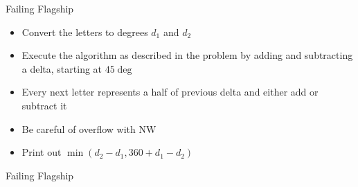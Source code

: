 \documentclass[11pt,pdf, aspectratio=169]{beamer}
\begin{document}
  \begin{frame}{Failing Flagship}
    \begin{itemize}
      \item Convert the letters to degrees $d_1$ and $d_2$
      \item Execute the algorithm as described in the problem by adding and subtracting a delta, starting at $45\deg$
      \item Every next letter represents a half of previous delta and either add or subtract it
      \item Be careful of overflow with NW
      \item Print out $\min(d_2-d_1, 360+d_1-d_2)$
    \end{itemize}
  \end{frame}
  \begin{frame}[containsverbatim]{Failing Flagship}
    \inputminted{python}{code/session-1/python/bapc-f.py}
  \end{frame}
\end{document}
